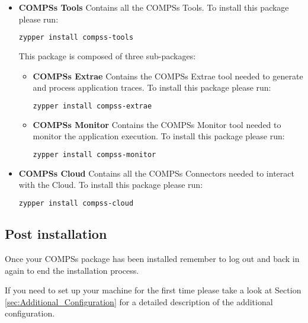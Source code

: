 \begin{itemize}
 \item \textbf{COMPSs Tools} \newline
       Contains all the COMPSs Tools.
       \newline
       To install this package please run:
       \begin{lstlisting}[language=bash]
	  zypper install compss-tools
       \end{lstlisting}
       This package is composed of three sub-packages:
       \begin{itemize}
        \item \textbf{COMPSs Extrae} \newline
	      Contains the COMPSs Extrae tool needed to generate and process application traces.
	      \newline
	      To install this package please run:
	      \begin{lstlisting}[language=bash]
		  zypper install compss-extrae
	      \end{lstlisting}
        \item \textbf{COMPSs Monitor} \newline
              Contains the COMPSs Monitor tool needed to monitor the application execution. 
              \newline
	      To install this package please run:
	      \begin{lstlisting}[language=bash]
		  zypper install compss-monitor
	      \end{lstlisting}
       \end{itemize}

 \item \textbf{COMPSs Cloud} \newline
       Contains all the COMPSs Connectors needed to interact with the Cloud.
       \newline
       To install this package please run:
       \begin{lstlisting}[language=bash]
	  zypper install compss-cloud
       \end{lstlisting}
\end{itemize} 

\subsection{Post installation}
Once your COMPSs package has been installed remember to log out and back in again to end the installation process.

If you need to set up your machine for the first time please take a look at Section \ref{sec:Additional_Configuration} for a 
detailed description of the additional configuration. 
